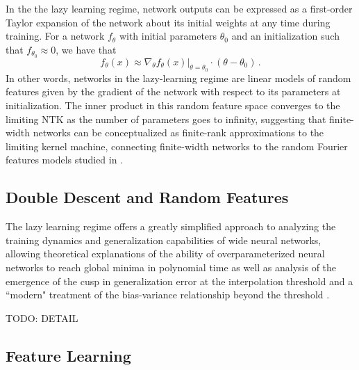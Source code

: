\documentclass[a4paper, 12pt]{article}
\begin{document}
In the the lazy learning regime, network outputs can be expressed as a first-order Taylor expansion of the network about its initial weights \cite{leeWideNeuralNetworks2019} at any time during training. For a network $f_\theta$ with initial parameters $\theta_0$ and an initialization such that $f_{\theta_0} \approx 0$, we have that
\begin{equation}
    f_\theta(x) \approx \nabla_\theta \left.f_\theta(x)\right|_{\theta=\theta_0} \cdot (\theta - \theta_0)\,.
\end{equation}
In other words, networks in the lazy-learning regime are linear models of random features given by the gradient of the network with respect to its parameters at initialization. The inner product in this random feature space converges to the limiting NTK as the number of parameters goes to infinity, suggesting that finite-width networks can be conceptualized as finite-rank approximations to the limiting kernel machine, connecting finite-width networks to the random Fourier features models studied in \cite{rahimiRandomFeaturesLargeScale2008}.

\subsection{Double Descent and Random Features}
The lazy learning regime offers a greatly simplified approach to analyzing the training dynamics and generalization capabilities of wide neural networks, allowing theoretical explanations of the ability of overparameterized neural networks to reach global minima in polynomial time \cite{allen-zhuConvergenceTheoryDeep2019} as well as analysis of the emergence of the cusp in generalization error at the interpolation threshold \cite{meiGeneralizationErrorRandom2019, geigerScalingDescriptionGeneralization2019} and a ``modern" treatment of the bias-variance relationship beyond the threshold \cite{dascoliDoubleTroubleDouble2020}. 

TODO: DETAIL

\subsection{Feature Learning}
\end{document}
